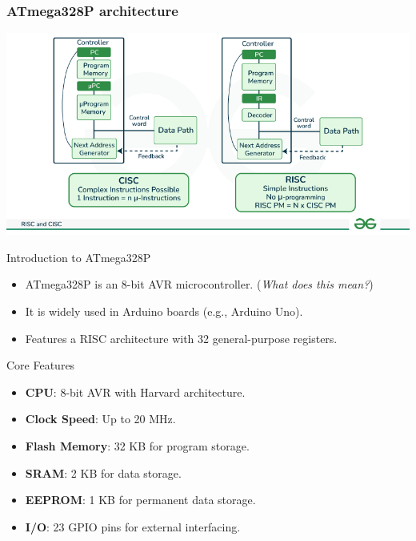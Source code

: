\documentclass[aspectratio=169]{beamer}
\begin{document}
\begin{frame}
  \frametitle{ATmega328P architecture}
  \centering
  \includegraphics[height=0.9\textheight]{assets/RISC-and-CISC.png}
\end{frame}

\begin{frame}{Introduction to ATmega328P}
    \begin{itemize}
        \item <1-> ATmega328P is an 8-bit AVR microcontroller. (\textit{What does this mean?})
        \item <2-> It is widely used in Arduino boards (e.g., Arduino Uno).
        \item <3-> Features a RISC architecture with 32 general-purpose registers.
    \end{itemize}
\end{frame}

\begin{frame}{Core Features}
    \begin{itemize}
        \item <1-> \textbf{CPU}: 8-bit AVR with Harvard architecture.
        \item <2-> \textbf{Clock Speed}: Up to 20 MHz.
        \item <3-> \textbf{Flash Memory}: 32 KB for program storage.
        \item <4-> \textbf{SRAM}: 2 KB for data storage.
        \item <5-> \textbf{EEPROM}: 1 KB for permanent data storage.
        \item <6-> \textbf{I/O}: 23 GPIO pins for external interfacing.
    \end{itemize}
\end{frame}
\end{document}
